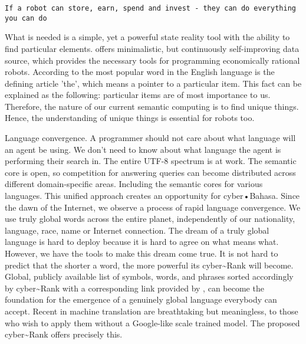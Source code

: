 \documentclass[8pt,oneside]{amsart}
\newcommand{\linkred}[2]{\href{#1}{\color{red}{#2}}}
\newcommand{\linkgreen}[2]{\href{#1}{\color{green}{#2}}}
\begin{document}
\begin{lstlisting}
If a robot can store, earn, spend and invest - they can do everything you can do
\end{lstlisting}

What is needed is a simple, yet a powerful state reality tool with the ability to find particular elements. \linkred{https://github.com/cybercongress/cyberd}{cyberd} offers minimalistic, but continuously self-improving data source, which provides the necessary tools for programming economically rational robots. According to \linkgreen{https://github.com/first20hours/google-10000-english}{top-10,000 English words} the most popular word in the English language is the defining article 'the', which means a pointer to a particular item. This fact can be explained as the following: particular items are of most importance to us. Therefore, the nature of our current semantic computing is to find unique things. Hence, the understanding of unique things is essential for robots too.

Language convergence. A programmer should not care about what language will an agent be using. We don't need to know about what language the agent is performing their search in. The entire UTF-8 spectrum is at work. The semantic core is open, so competition for answering queries can become distributed across different domain-specific areas. Including the semantic cores for various languages. This unified approach creates an opportunity for cyber•Bahasa. Since the dawn of the Internet, we observe a process of rapid language convergence. We use truly global words across the entire planet, independently of our nationality, language, race, name or Internet connection. The dream of a truly global language is hard to deploy because it is hard to agree on what means what. However, we have the tools to make this dream come true. It is not hard to predict that the shorter a word, the more powerful its cyber\~{}Rank will become. Global, publicly available list of symbols, words, and phrases sorted accordingly by cyber\~{}Rank with a corresponding link provided by \linkred{https://github.com/cybercongress/cyberd}{cyberd}, can become the foundation for the emergence of a genuinely global language everybody can accept. Recent \linkgreen{https://ipfs.io/ipfs/QmQUWBhDMfPKgFt3NfbxM1VU22oU8CRepUzGPBDtopwap1}{scientific advances} in machine translation are breathtaking but meaningless, to those who wish to apply them without a Google-like scale trained model. The proposed cyber\~{}Rank offers precisely this.
\end{document}
